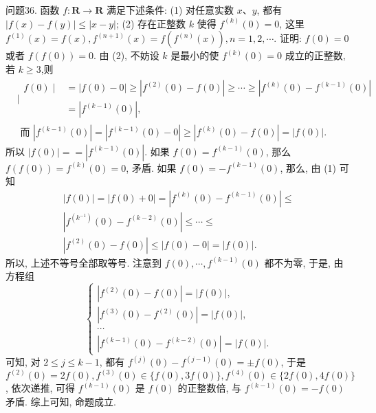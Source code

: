 问题36. 函数 $f: \mathbf{R} \rightarrow \mathbf{R}$ 满足下述条件:
(1) 对任意实数 $x 、 y$, 都有 $|f(x)-f(y)| \leqslant|x-y|$;
(2) 存在正整数 $k$ 使得 $f^{(k)}(0)=0$, 这里 $f^{(1)}(x)=f(x), f^{(n+1)}(x)= f\left(f^{(n)}(x)\right), n=1,2, \cdots$.
证明: $f(0)=0$ 或者 $f(f(0))=0$.
由 (2), 不妨设 $k$ 是最小的使 $f^{(k)}(0)=0$ 成立的正整数,若 $k \geqslant 3$,则
$$
\begin{aligned}
& \mid \begin{aligned}
f(0) \mid & =|f(0)-0| \geqslant\left|f^{(2)}(0)-f(0)\right| \geqslant \cdots \geqslant\left|f^{(k)}(0)-f^{(k-1)}(0)\right| \\
& =\left|f^{(k-1)}(0)\right|,
\end{aligned} \\
& \text { 而 }\left|f^{(k-1)}(0)\right|=\left|f^{(k-1)}(0)-0\right| \geqslant\left|f^{(k)}(0)-f(0)\right|=|f(0)| .
\end{aligned}
$$
所以 $|f(0)|==\left|f^{(k-1)}(0)\right|$.
如果 $f(0)=f^{(k-1)}(0)$, 那么 $f(f(0))=f^{(k)}(0)=0$, 矛盾.
如果 $f(0)=-f^{(k-1)}(0)$, 那么, 由 (1) 可知
$$
\begin{gathered}
|f(0)|=|f(0)+0|=\left|f^{(k)}(0)-f^{(k-1)}(0)\right| \leqslant \\
\left|f^{\left(k^{-1}\right)}(0)-f^{(k-2)}(0)\right| \leqslant \cdots \leqslant \\
\left|f^{(2)}(0)-f(0)\right| \leqslant|f(0)-0|=|f(0)| .
\end{gathered}
$$
所以, 上述不等号全部取等号.
注意到 $f(0), \cdots, f^{(k-1)}(0)$ 都不为零, 于是, 由方程组
$$
\left\{\begin{array}{l}
\left|f^{(2)}(0)-f(0)\right|=|f(0)|, \\
\left|f^{(3)}(0)-f^{(2)}(0)\right|=|f(0)|, \\
\cdots \\
\left|f^{(k-1)}(0)-f^{(k-2)}(0)\right|=|f(0)| .
\end{array}\right.
$$
可知, 对 $2 \leqslant j \leqslant k-1$, 都有 $f^{(j)}(0)-f^{(j-1)}(0)= \pm f(0)$, 于是 $f^{(2)}(0)= 2 f(0), f^{(3)}(0) \in\{f(0), 3 f(0)\}, f^{(4)}(0) \in\{2 f(0), 4 f(0)\}$, 依次递推, 可得 $f^{(k-1)}(0)$ 是 $f(0)$ 的正整数倍, 与 $f^{(k-1)}(0)=-f(0)$ 矛盾.
综上可知, 命题成立.



